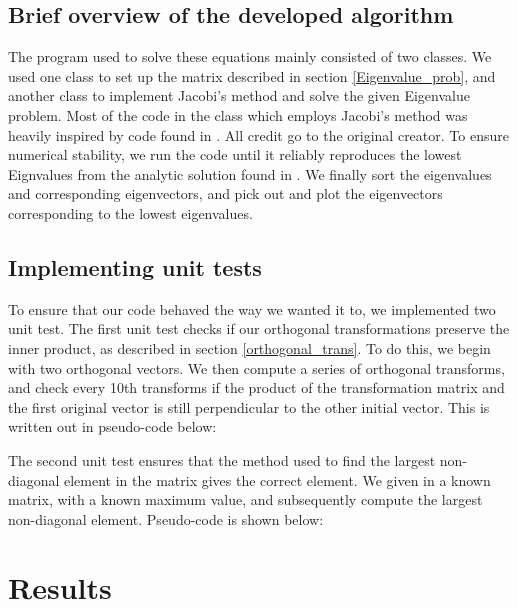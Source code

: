 \documentclass[a4paper, 10pt]{article}
\begin{document}
\subsection{Brief overview of the developed algorithm}
The program used to solve these equations mainly consisted of two classes. We used one class to set up the matrix described in section \ref{Eigenvalue_prob}, and another class to implement Jacobi's method and solve the given Eigenvalue problem. Most of the code in the class which employs Jacobi's method was heavily inspired by code found in \cite{Morten2}. All credit go to the original creator. To ensure numerical stability, we run the code until it reliably reproduces the lowest Eignvalues from the analytic solution found in \cite{Analytic}. We finally sort the eigenvalues and corresponding eigenvectors, and pick out and plot the eigenvectors corresponding to the lowest eigenvalues.
\subsection{Implementing unit tests}
To ensure that our code behaved the way we wanted it to, we implemented two unit test. The first unit test checks if our orthogonal transformations preserve the inner product, as described in section \ref{orthogonal_trans}. To do this, we begin with two orthogonal vectors. We then compute a series of orthogonal transforms, and check every 10th transforms if the product of the transformation matrix and the first original vector is still perpendicular to the other initial vector. This is written out in pseudo-code below:


The second unit test ensures that the method used to find the largest non-diagonal element in the matrix gives the correct element. We given in a known matrix, with a known maximum value, and subsequently compute the largest non-diagonal element. Pseudo-code is shown below:





\section{Results}
\end{document}
